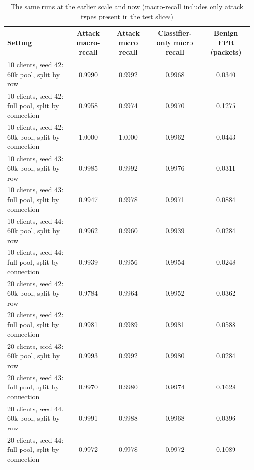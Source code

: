 \begin{table}[H]
\centering
\scriptsize
\setlength{\tabcolsep}{3pt}
\renewcommand{\arraystretch}{1.15}
\begin{tabular}{|l|c|c|c|c|}
\hline
\textbf{Setting} & \textbf{Attack macro-recall} & \textbf{Attack micro recall} & \textbf{Classifier-only micro recall} & \textbf{Benign FPR (packets)} \\ \hline
10 clients, seed 42: 60k pool, split by row & 0.9990 & 0.9992 & 0.9968 & 0.0340 \\ \hline
10 clients, seed 42: full pool, split by connection & 0.9958 & 0.9974 & 0.9970 & 0.1275 \\ \hline
10 clients, seed 42: 60k pool, split by connection & 1.0000 & 1.0000 & 0.9962 & 0.0443 \\ \hline
10 clients, seed 43: 60k pool, split by row & 0.9985 & 0.9992 & 0.9976 & 0.0311 \\ \hline
10 clients, seed 43: full pool, split by connection & 0.9947 & 0.9978 & 0.9971 & 0.0884 \\ \hline
10 clients, seed 44: 60k pool, split by row & 0.9962 & 0.9960 & 0.9939 & 0.0284 \\ \hline
10 clients, seed 44: full pool, split by connection & 0.9939 & 0.9956 & 0.9954 & 0.0248 \\ \hline
20 clients, seed 42: 60k pool, split by row & 0.9784 & 0.9964 & 0.9952 & 0.0362 \\ \hline
20 clients, seed 42: full pool, split by connection & 0.9981 & 0.9989 & 0.9981 & 0.0588 \\ \hline
20 clients, seed 43: 60k pool, split by row & 0.9993 & 0.9992 & 0.9980 & 0.0284 \\ \hline
20 clients, seed 43: full pool, split by connection & 0.9970 & 0.9980 & 0.9974 & 0.1628 \\ \hline
20 clients, seed 44: 60k pool, split by row & 0.9991 & 0.9988 & 0.9968 & 0.0396 \\ \hline
20 clients, seed 44: full pool, split by connection & 0.9972 & 0.9978 & 0.9972 & 0.1089 \\ \hline
\end{tabular}
\caption{The same runs at the earlier scale and now (macro-recall includes only attack types present in the test slices)}
\label{tab:full_pool_compare}
\end{table}

